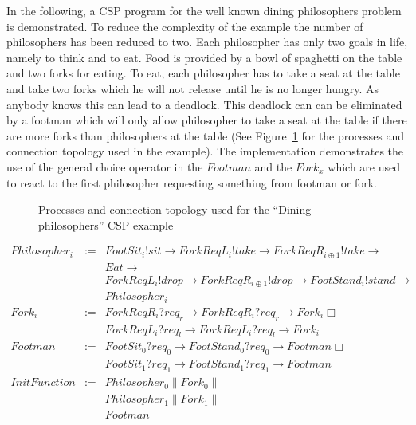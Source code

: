 %  

In the following, a CSP program for the well known dining
philosophers problem is demonstrated. To reduce the complexity
of the example the number of philosophers has been reduced
to two. Each philosopher has only two goals in life, namely to think and
to eat. Food is provided by a bowl of spaghetti on the table and
two forks for eating. To eat, each philosopher has to take a seat
at the table and take two forks which he will not release until he
is no longer hungry. As anybody knows this can lead to a deadlock.
This deadlock can can be eliminated by a footman which will only
allow philosopher to take a seat at the table if there are more
forks than philosophers at the table (See Figure~\ref{fig:dining-philosophers}
for the processes and connection topology used in the example).
The implementation demonstrates the use of the general choice operator
in the $Footman$ and the $Fork_{x}$ which are used to react to the first
philosopher requesting something from footman or fork.

\begin{figure}[h]
\centering

\caption{Processes and connection topology used for the ``Dining philosophers'' CSP example}
\label{fig:dining-philosophers}
\end{figure}

\begin{displaymath}
\begin{array}{rcl}
Philosopher_{i}    & := & FootSit_{i}!sit \to ForkReqL_{i}!take \to ForkReqR_{i\oplus1}!take \to \\
                   &    & Eat \to \\
                   &    & ForkReqL_{i}!drop \to ForkReqR_{i\oplus1}!drop \to FootStand_{i}!stand \to \\
                   &        & Philosopher_{i} \\
Fork_{i}           & := & ForkReqR_{i}?req_{r} \to ForkReqR_{i}?req_{r} \to Fork_{i} \Box \\
                   &    & ForkReqL_{i}?req_{l} \to ForkReqL_{i}?req_{l} \to Fork_{i} \\
Footman                   & := & FootSit_{0}?req_{0} \to FootStand_{0}?req_{0} \to Footman \Box \\
                   &    & FootSit_{1}?req_{1} \to FootStand_{1}?req_{1} \to Footman \\
InitFunction       & := & Philosopher_{0} \| Fork_{0} \| \\
                   &    & Philosopher_{1} \| Fork_{1} \| \\
                   &    & Footman \\
\end{array}
\end{displaymath}

